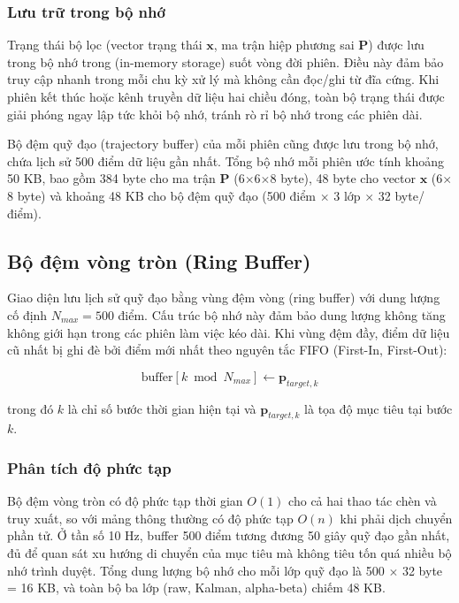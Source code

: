 \subsubsection{Lưu trữ trong bộ nhớ}

\hspace{0.5cm} Trạng thái bộ lọc (vector trạng thái $\mathbf{x}$, ma trận hiệp phương sai $\mathbf{P}$) được lưu trong bộ nhớ trong (in-memory storage) suốt vòng đời phiên. Điều này đảm bảo truy cập nhanh trong mỗi chu kỳ xử lý mà không cần đọc/ghi từ đĩa cứng. Khi phiên kết thúc hoặc kênh truyền dữ liệu hai chiều đóng, toàn bộ trạng thái được giải phóng ngay lập tức khỏi bộ nhớ, tránh rò rỉ bộ nhớ trong các phiên dài.

Bộ đệm quỹ đạo (trajectory buffer) của mỗi phiên cũng được lưu trong bộ nhớ, chứa lịch sử 500 điểm dữ liệu gần nhất. Tổng bộ nhớ mỗi phiên ước tính khoảng 50 KB, bao gồm 384 byte cho ma trận $\mathbf{P}$ (6$\times$6$\times$8 byte), 48 byte cho vector $\mathbf{x}$ (6$\times$8 byte) và khoảng 48 KB cho bộ đệm quỹ đạo (500 điểm $\times$ 3 lớp $\times$ 32 byte/điểm).

\subsection{Bộ đệm vòng tròn (Ring Buffer)}

\hspace{0.5cm} Giao diện lưu lịch sử quỹ đạo bằng vùng đệm vòng (ring buffer) với dung lượng cố định $N_{max} = 500$ điểm. Cấu trúc bộ nhớ này đảm bảo dung lượng không tăng không giới hạn trong các phiên làm việc kéo dài. Khi vùng đệm đầy, điểm dữ liệu cũ nhất bị ghi đè bởi điểm mới nhất theo nguyên tắc FIFO (First-In, First-Out):

\begin{equation}
\text{buffer}[k \bmod N_{max}] \leftarrow \mathbf{p}_{target,k}
\end{equation}

trong đó $k$ là chỉ số bước thời gian hiện tại và $\mathbf{p}_{target,k}$ là tọa độ mục tiêu tại bước $k$.

\subsubsection{Phân tích độ phức tạp}

\hspace{0.5cm} Bộ đệm vòng tròn có độ phức tạp thời gian $O(1)$ cho cả hai thao tác chèn và truy xuất, so với mảng thông thường có độ phức tạp $O(n)$ khi phải dịch chuyển phần tử. Ở tần số 10 Hz, buffer 500 điểm tương đương 50 giây quỹ đạo gần nhất, đủ để quan sát xu hướng di chuyển của mục tiêu mà không tiêu tốn quá nhiều bộ nhớ trình duyệt. Tổng dung lượng bộ nhớ cho mỗi lớp quỹ đạo là 500 $\times$ 32 byte = 16 KB, và toàn bộ ba lớp (raw, Kalman, alpha-beta) chiếm 48 KB.

